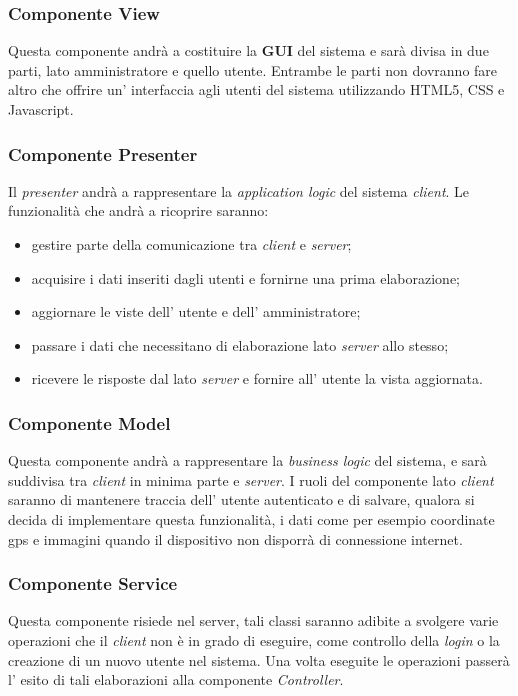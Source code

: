 \subsubsection{Componente View}
Questa componente andrà a costituire la \textbf{GUI} del sistema e sarà divisa in due parti, lato amministratore e quello utente. Entrambe le parti non dovranno fare altro che offrire un' interfaccia agli utenti del sistema utilizzando HTML5, CSS e Javascript.
\subsubsection{Componente Presenter}
Il \textit{presenter} andrà a rappresentare la \textit{application logic} del sistema \textit{client}. Le funzionalità che andrà a ricoprire saranno:
\begin{itemize}
	\item gestire parte della comunicazione tra \textit{client} e \textit{server};
	\item acquisire i dati inseriti dagli utenti e fornirne una prima elaborazione;
	\item aggiornare le viste dell' utente e dell' amministratore;
	\item passare i dati che necessitano di elaborazione lato \textit{server} allo stesso;
	\item ricevere le risposte dal lato \textit{server} e fornire all' utente la vista aggiornata.
\end{itemize}
\subsubsection{Componente Model}
Questa componente andrà a rappresentare la \textit{business logic} del sistema, e sarà suddivisa tra \textit{client} in minima parte e \textit{server}.
I ruoli del componente lato \textit{client} saranno di mantenere traccia dell' utente autenticato e di salvare, qualora si decida di implementare questa funzionalità, i dati come per esempio coordinate gps e immagini quando il dispositivo non disporrà di connessione internet.
\subsubsection{Componente Service}
Questa componente risiede nel server, tali classi saranno adibite a svolgere varie operazioni che il \textit{client} non è in grado di eseguire, come controllo della \textit{login} o la creazione di un nuovo utente nel sistema. Una volta eseguite le operazioni passerà l' esito di tali elaborazioni alla componente \textit{Controller}.
